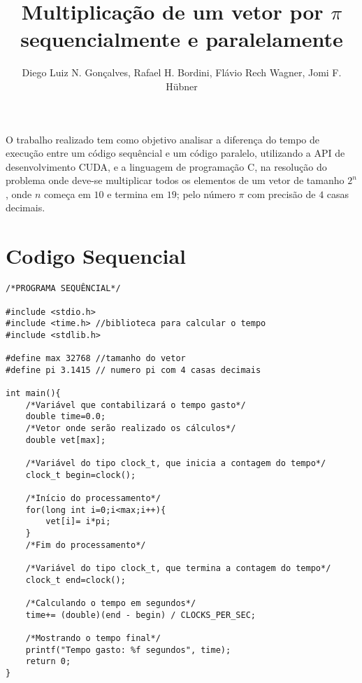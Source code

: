 \documentclass[a4paper, 12pt]{article}
\title{Multiplicação de um vetor por $\pi$ sequencialmente e paralelamente}
\author{Diego Luiz N. Gonçalves\inst{1}, Rafael H. Bordini\inst{2}, Flávio Rech
  Wagner\inst{1}, Jomi F. Hübner\inst{3} }
\begin{document}
 

\maketitle
 
\begin{resumo} 
  O trabalho realizado tem como objetivo analisar a diferença do tempo de execução entre um código sequêncial e um código paralelo, utilizando a API de desenvolvimento CUDA, e a linguagem de programação C, na resolução do problema onde deve-se multiplicar todos os elementos de um vetor de tamanho $2^n$, onde $n$ começa em $10$ e termina em $19$; pelo número $\pi$ com precisão de $4$ casas decimais.
\end{resumo}

\section{Codigo Sequencial}
\begin{lstlisting}
/*PROGRAMA SEQUÊNCIAL*/

#include <stdio.h>
#include <time.h> //biblioteca para calcular o tempo
#include <stdlib.h>

#define max 32768 //tamanho do vetor 
#define pi 3.1415 // numero pi com 4 casas decimais

int main(){
    /*Variável que contabilizará o tempo gasto*/
    double time=0.0; 
    /*Vetor onde serão realizado os cálculos*/
    double vet[max]; 
    
    /*Variável do tipo clock_t, que inicia a contagem do tempo*/
    clock_t begin=clock(); 
    
    /*Início do processamento*/
    for(long int i=0;i<max;i++){ 
        vet[i]= i*pi;
    }
    /*Fim do processamento*/
    
    /*Variável do tipo clock_t, que termina a contagem do tempo*/
    clock_t end=clock(); 
    
    /*Calculando o tempo em segundos*/
    time+= (double)(end - begin) / CLOCKS_PER_SEC;
    
    /*Mostrando o tempo final*/
    printf("Tempo gasto: %f segundos", time); 
    return 0;
}
\end{lstlisting}
\end{document}
